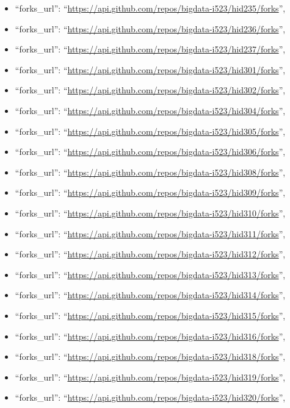 \begin{itemize}
\item
  ``forks\_url'':
  ``\url{https://api.github.com/repos/bigdata-i523/hid235/forks}'',
\item
  ``forks\_url'':
  ``\url{https://api.github.com/repos/bigdata-i523/hid236/forks}'',
\item
  ``forks\_url'':
  ``\url{https://api.github.com/repos/bigdata-i523/hid237/forks}'',
\item
  ``forks\_url'':
  ``\url{https://api.github.com/repos/bigdata-i523/hid301/forks}'',
\item
  ``forks\_url'':
  ``\url{https://api.github.com/repos/bigdata-i523/hid302/forks}'',
\item
  ``forks\_url'':
  ``\url{https://api.github.com/repos/bigdata-i523/hid304/forks}'',
\item
  ``forks\_url'':
  ``\url{https://api.github.com/repos/bigdata-i523/hid305/forks}'',
\item
  ``forks\_url'':
  ``\url{https://api.github.com/repos/bigdata-i523/hid306/forks}'',
\item
  ``forks\_url'':
  ``\url{https://api.github.com/repos/bigdata-i523/hid308/forks}'',
\item
  ``forks\_url'':
  ``\url{https://api.github.com/repos/bigdata-i523/hid309/forks}'',
\item
  ``forks\_url'':
  ``\url{https://api.github.com/repos/bigdata-i523/hid310/forks}'',
\item
  ``forks\_url'':
  ``\url{https://api.github.com/repos/bigdata-i523/hid311/forks}'',
\item
  ``forks\_url'':
  ``\url{https://api.github.com/repos/bigdata-i523/hid312/forks}'',
\item
  ``forks\_url'':
  ``\url{https://api.github.com/repos/bigdata-i523/hid313/forks}'',
\item
  ``forks\_url'':
  ``\url{https://api.github.com/repos/bigdata-i523/hid314/forks}'',
\item
  ``forks\_url'':
  ``\url{https://api.github.com/repos/bigdata-i523/hid315/forks}'',
\item
  ``forks\_url'':
  ``\url{https://api.github.com/repos/bigdata-i523/hid316/forks}'',
\item
  ``forks\_url'':
  ``\url{https://api.github.com/repos/bigdata-i523/hid318/forks}'',
\item
  ``forks\_url'':
  ``\url{https://api.github.com/repos/bigdata-i523/hid319/forks}'',
\item
  ``forks\_url'':
  ``\url{https://api.github.com/repos/bigdata-i523/hid320/forks}'',

\end{itemize}
